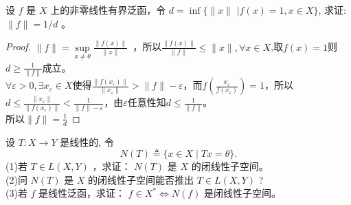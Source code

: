 \documentclass[lang=cn,newtx,10pt,scheme=chinese,thmcnt=chapter]{elegantbook}
\begin{document}
\begin{problem}
 设 $f$ 是 ${X}$ 上的非零线性有界泛函，令 $d=\inf \{\|x\|$ $\mid f(x)=1,x\in{X}\}$, 求证: $\|f\|=1 / d$ 。
\end{problem}
\begin{proof}
$\|f\|=\sup\limits_{x\neq \theta}\frac{\|f(x)\|}{\|x\|}$\    ，所以$\frac{\|f(x)\|}{\|f\|}\leqslant \|x\|,\forall x\in {X}$,取$f(x)=1$则$d\geqslant \frac{1}{\|f\|}$成立。\\
$\forall \varepsilon >0,\exists x_\varepsilon\in {X}$使得$\frac{\|f(x_\varepsilon)\|}{\|x_\varepsilon\|}>\|f\|-\varepsilon$，而$f(\frac{x_\varepsilon}{f(x_\varepsilon)})=1$，所以$d\leqslant\frac{\|x_\varepsilon\|}{\|f(x_\varepsilon)\|}<\frac{1}{\|f\|-\varepsilon} $，由$\varepsilon$任意性知$d\leqslant \frac{1}{\|f\|}$。\\
所以$\|f\|=\frac{1}{d}$
\end{proof}
\begin{problem}
 设 $T: {X} \rightarrow {Y}$ 是线性的, 令
\begin{equation*}
N(T) \triangleq\{x \in {X} \mid T x=\theta\} .
\end{equation*}
(1)若 $T \in {L} ( {X} , {Y} )$ ，求证： $N(T)$ 是 ${X}$ 的闭线性子空间。\\
(2)问 $N(T)$ 是 ${X}$ 的闭线性子空间能否推出 $T \in {L} ( {X},{Y})$ ?\\
(3)若 $f$ 是线性泛函，求证： $f \in {X} ^* \Longleftrightarrow N(f)$ 是闭线性子空间。

\end{problem}
\end{document}
